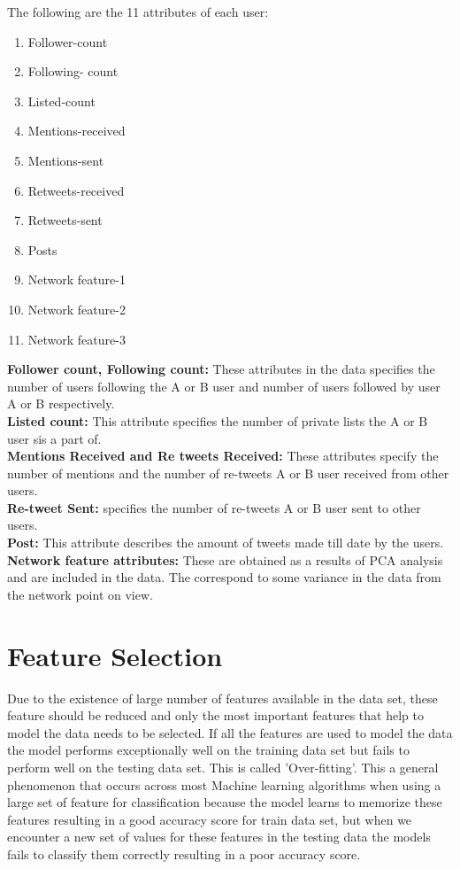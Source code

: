 \documentclass[sigconf]{acmart}
\begin{document}
The following are the 11 attributes of each user:
\begin{enumerate}
    \item Follower-count
    \item Following- count
    \item Listed-count
    \item Mentions-received
    \item Mentions-sent
    \item Retweets-received
    \item Retweets-sent
    \item Posts 
    \item Network feature-1
    \item Network feature-2
    \item Network feature-3 
\end{enumerate}
\textbf{Follower count, Following count:} These attributes in the data specifies the number of users following the A or B user and number of users followed by user A or B respectively. \\
\textbf{Listed count:} This attribute specifies the number of private lists the A or B user sis a part of.\\
\textbf{Mentions Received and Re tweets Received:} These attributes specify the number of mentions and the number of re-tweets A or B user received from other users.\\
\textbf{Re-tweet Sent:} specifies the number of re-tweets A or B user sent to other users.\\
\textbf{Post:} This attribute describes the amount of tweets made till date by the users.\\
\textbf{Network feature attributes:} These are obtained as a results of PCA analysis and are included in the data. The correspond to some variance in the data from the network point on view.


\section{Feature Selection}

Due to the existence of large number of features available in the data set, these feature should be reduced and only the most important features that help to model the data needs to be selected. If all the features are used to model the data the model performs exceptionally well on the training data set but fails to perform well on the testing data set. This is called 'Over-fitting'. This a general phenomenon that occurs across most Machine learning algorithms when using a large set of feature for classification because the model learns to memorize these features resulting in a good accuracy score for train data set, but when we encounter a new set of values for these features in the testing data the models fails to classify them correctly resulting in a poor accuracy score.
\end{document}
